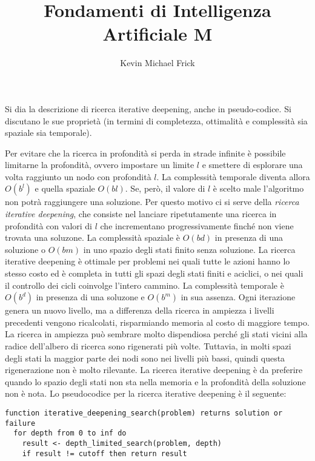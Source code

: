 \documentclass[answers, a4paper, 11pt]{exam}
\title{Fondamenti di Intelligenza Artificiale M}
\author{Kevin Michael Frick}
\begin{document}
\maketitle

\begin{questions}
\question Si dia la descrizione di ricerca iterative deepening, anche in pseudo-codice. Si discutano le sue
proprietà (in termini di completezza, ottimalità e complessità sia spaziale sia temporale).
	\begin{solution}
		Per evitare che la ricerca in profondità si perda in strade infinite è possibile limitarne la profondità, ovvero impostare un limite $l$ e smettere di esplorare una volta raggiunto un nodo con profondità $l$.
		La complessità temporale diventa allora $O(b^l)$ e quella spaziale $O(bl)$. 
		Se, però, il valore di $l$ è scelto male l'algoritmo non potrà raggiungere una soluzione. 
		Per questo motivo ci si serve della \emph{ricerca iterative deepening}, che consiste nel lanciare ripetutamente una ricerca in profondità con valori di $l$ che incrementano progressivamente finché non viene trovata una soluzone. 
		La complessità spaziale è $O(bd)$ in presenza di una soluzione o $O(bm)$ in uno spazio degli stati finito senza soluzione. 
		La ricerca iterative deepening è ottimale per problemi nei quali tutte le azioni hanno lo stesso costo ed è completa in tutti gli spazi degli stati finiti e aciclici, o nei quali il controllo dei cicli coinvolge l'intero cammino. 
		La complessità temporale è $O(b^d)$ in presenza di una soluzone e $O(b^m)$ in sua assenza. 
		Ogni iterazione genera un nuovo livello, ma a differenza della ricerca in ampiezza i livelli precedenti vengono ricalcolati, risparmiando memoria al costo di maggiore tempo. 
		La ricerca in ampiezza può sembrare molto dispendiosa perché gli stati vicini alla radice dell'albero di ricerca sono rigenerati più volte. 
		Tuttavia, in molti spazi degli stati la maggior parte dei nodi sono nei livelli più bassi, quindi questa rigenerazione non è molto rilevante. 
		La ricerca iterative deepening è da preferire quando lo spazio degli stati non sta nella memoria e la profondità della soluzione non è nota. 
	Lo pseudocodice per la ricerca iterative deepening è il seguente:
\begin{verbatim}
function iterative_deepening_search(problem) returns solution or failure
  for depth from 0 to inf do
    result <- depth_limited_search(problem, depth)
    if result != cutoff then return result


\end{verbatim}
\end{solution}
\end{questions}
\end{document}
